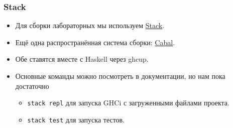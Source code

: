 \documentclass[10pt]{beamer}
\begin{document}
\begin{frame}[fragile]
  \frametitle{Stack}
  \begin{itemize}
    \item Для сборки лабораторных мы используем \href{https://docs.haskellstack.org/en/stable/#quick-start-guide}{Stack}.
    \item Ещё одна распространённая система сборки: \href{https://cabal.readthedocs.io/}{Cabal}.
    \item Обе ставятся вместе с Haskell через ghcup.
    \item Основные команды можно посмотреть в документации, но нам пока достаточно
          \begin{itemize}
            \item \lstinline|stack repl| для запуска GHCi с загруженными файлами проекта.
            \item \lstinline|stack test| для запуска тестов.
          \end{itemize}
  \end{itemize}
\end{frame}
\end{document}
